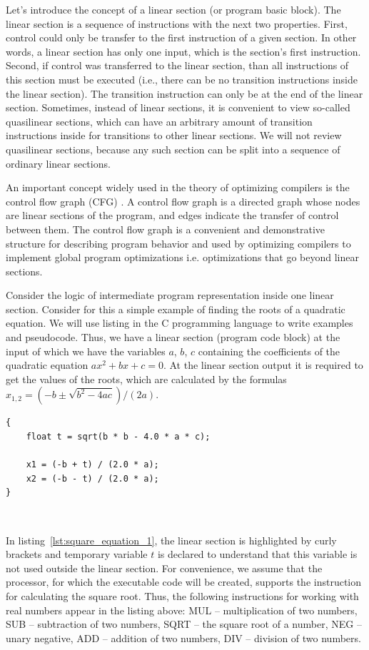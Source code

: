 \documentclass[
11pt,%
tightenlines,%
twoside,%
onecolumn,%
nofloats,%
nobibnotes,%
nofootinbib,%
superscriptaddress,%
noshowpacs,%
centertags]%
{revtex4}
\begin{document}
Let's introduce the concept of a linear section (or program basic block).
The linear section is a sequence of instructions with the next two properties.
First, control could only be transfer to the first instruction of a given section.
In other words, a linear section has only one input, which is the section's first  instruction.
Second, if control was transferred to the linear section, than all instructions of this section must be executed (i.e., there can be no transition instructions inside the linear section).
The transition instruction can only be at the end of the linear section.
Sometimes, instead of linear sections, it is convenient to view so-called quasilinear sections, which can have an arbitrary amount of transition instructions inside for transitions to other linear sections.
We will not review quasilinear sections, because any such section can be split into a sequence of ordinary linear sections.

An important concept widely used in the theory of optimizing compilers is the control flow graph (CFG) \cite{Muchnick}.
A control flow graph is a directed graph whose nodes are linear sections of the program, and edges indicate the transfer of control between them.
The control flow graph is a convenient and demonstrative structure for describing program behavior and used by optimizing compilers to implement global program optimizations i.e. optimizations that go beyond linear sections.

Consider the logic of intermediate program representation inside one linear section.
Consider for this a simple example of finding the roots of a quadratic equation.
We will use listing in the C programming language to write examples and pseudocode.
Thus, we have a linear section (program code block) at the input of which we have the variables $a$, $b$, $c$ containing the coefficients of the quadratic equation $ax^2 + bx + c = 0$.
At the linear section output it is required to get the values of the roots, which are calculated by the formulas $x_{1,2} = (-b \pm \sqrt{b^2 - 4ac})/(2a)$.

\begin{lstlisting}[caption={The code block for calculating the roots of quadratic equation.},label={lst:square_equation_1}]
{
    float t = sqrt(b * b - 4.0 * a * c);
    
    x1 = (-b + t) / (2.0 * a);
    x2 = (-b - t) / (2.0 * a);
}
\end{lstlisting}

\

In listing~\ref{lst:square_equation_1}, the linear section is highlighted by curly brackets and temporary variable $t$ is declared to understand that this variable is not used outside the linear section.
For convenience, we assume that the processor, for which the executable code will be created, supports the instruction for calculating the square root.
Thus, the following instructions for working with real numbers appear in the listing above: MUL -- multiplication of two numbers, SUB -- subtraction of two numbers, SQRT -- the square root of a number, NEG -- unary negative, ADD -- addition of two numbers, DIV -- division of two numbers.
\end{document}
